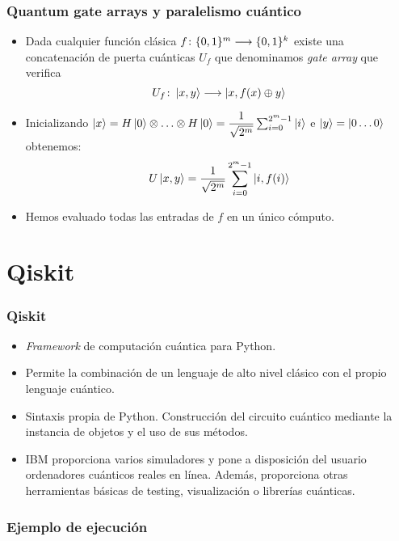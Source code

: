 \documentclass{beamer}
\begin{document}
\begin{frame}
	\frametitle{Quantum gate arrays y paralelismo cuántico}
	\begin{itemize}
 	\item Dada cualquier función clásica $f\colon \{0,1\}^m\longrightarrow \{0,1\}^k$ existe una concatenación de puerta cuánticas $U_f$ que denominamos \emph{gate array} que verifica
 	$$U_f\colon \left|x,y\right\rangle\longrightarrow \left|x,f(x)\oplus y\right\rangle$$
 	\item Inicializando $\left|x\right\rangle=H\left|0\right\rangle\otimes\hdots\otimes H\left|0\right\rangle=\dfrac{1}{\sqrt{2^m}}\sum_{i=0}^{2^m-1}\left|i\right\rangle$ e $\left|y\right\rangle=\left|0\hdots0\right\rangle$ obtenemos:
 	$$U\left|x,y\right\rangle=\dfrac{1}{\sqrt{2^m}}\sum_{i=0}^{2^m-1}\left|i,f(i)\right\rangle$$
 	\item Hemos evaluado todas las entradas de $f$ en un único cómputo.
	\end{itemize}
\end{frame}


\section{Qiskit}
\begin{frame}
	\frametitle{Qiskit}
	\begin{itemize}
 	\item \textit{Framework} de computación cuántica para Python.
 	\item Permite la combinación de un lenguaje de alto nivel clásico con el propio lenguaje cuántico.
 	\item Sintaxis propia de Python. Construcción del circuito cuántico mediante la instancia de objetos y el uso de sus métodos.
 	\item IBM proporciona varios simuladores y pone a disposición del usuario ordenadores cuánticos reales en línea. Además, proporciona otras herramientas básicas de testing, visualización o librerías cuánticas.
	\end{itemize}
\end{frame}

\begin{frame}
	\frametitle{Ejemplo de ejecución}
	
\end{frame}
\end{document}
